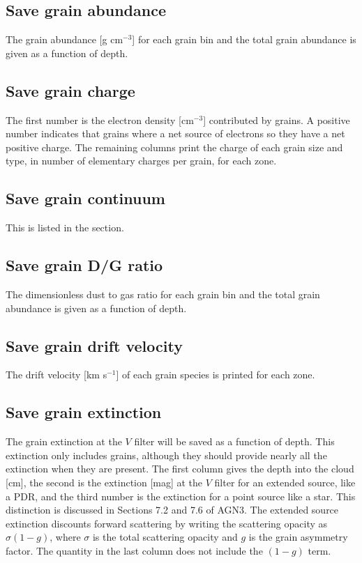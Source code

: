 \subsection{Save grain abundance}

The grain abundance [g cm$^{-3}$] for each grain bin and the total grain
abundance is given as a function of depth.

\subsection{Save grain charge}

The first number is the electron density [cm$^{-3}$] contributed by grains.
A positive number indicates that grains where a net source of electrons
so they have a net positive charge.  The remaining columns print the charge
of each grain size and type, in number of elementary charges per grain,
for each zone.

\subsection{Save grain continuum}

This is listed in the  section.

\subsection{Save grain D/G ratio}

The dimensionless dust to gas ratio for each grain bin and the total
grain abundance is given as a function of depth.

\subsection{Save grain drift velocity}

The drift velocity [km s$^{-1}$] of each grain species is printed for each zone.

\subsection{Save grain extinction}

The grain extinction at the $V$ filter will be saved as a function of
depth.  This extinction only includes grains, although they should provide
nearly all the extinction when they are present.  The first column gives
the depth into the cloud [cm], the second is the extinction [mag] at the
$V$ filter for an extended source, like a PDR, and the third number is the
extinction for a point source like a star.  This distinction is discussed
in Sections 7.2 and 7.6 of AGN3.  The extended source extinction discounts
forward scattering by writing the scattering opacity as $\sigma ( 1-g )$,
where $\sigma$ is the total scattering opacity and $g$ is the grain asymmetry
factor.
The quantity in the last column does not include the $({1-g})$
term.

